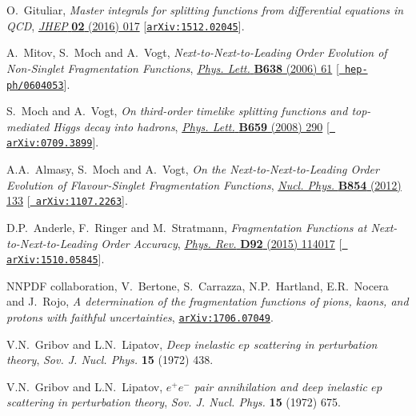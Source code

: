 \documentclass[12pt]{article}
\begin{document}
{\begin{thebibliography}{100}
O.~Gituliar, \emph{{Master integrals for splitting functions from differential
  equations in QCD}},
  \href{https://dx.doi.org/10.1007/JHEP02(2016)017}{\emph{JHEP} {\bf 02} (2016)
  017} [\href{https://arxiv.org/abs/1512.02045}{{\tt arXiv:1512.02045}}].

A.~Mitov, S.~Moch and A.~Vogt, \emph{{Next-to-Next-to-Leading Order Evolution
  of Non-Singlet Fragmentation Functions}},
  \href{https://dx.doi.org/10.1016/j.physletb.2006.05.005}{\emph{Phys. Lett.}
  {\bf B638} (2006) 61} [\href{https://arxiv.org/abs/hep-ph/0604053}{{\tt
  hep-ph/0604053}}].

S.~Moch and A.~Vogt, \emph{{On third-order timelike splitting functions and
  top-mediated Higgs decay into hadrons}},
  \href{https://dx.doi.org/10.1016/j.physletb.2007.10.069}{\emph{Phys. Lett.}
  {\bf B659} (2008) 290} [\href{https://arxiv.org/abs/0709.3899}{{\tt
  arXiv:0709.3899}}].

A.A.~Almasy, S.~Moch and A.~Vogt, \emph{{On the Next-to-Next-to-Leading Order
  Evolution of Flavour-Singlet Fragmentation Functions}},
  \href{https://dx.doi.org/10.1016/j.nuclphysb.2011.08.028}{\emph{Nucl. Phys.}
  {\bf B854} (2012) 133} [\href{https://arxiv.org/abs/1107.2263}{{\tt
  arXiv:1107.2263}}].

D.P.~Anderle, F.~Ringer and M.~Stratmann, \emph{{Fragmentation Functions at
  Next-to-Next-to-Leading Order Accuracy}},
  \href{https://dx.doi.org/10.1103/PhysRevD.92.114017}{\emph{Phys. Rev.} {\bf
  D92} (2015) 114017} [\href{https://arxiv.org/abs/1510.05845}{{\tt
  arXiv:1510.05845}}].

{\scshape NNPDF} collaboration, V.~Bertone, S.~Carrazza, N.P.~Hartland,
  E.R.~Nocera and J.~Rojo, \emph{{A determination of the fragmentation
  functions of pions, kaons, and protons with faithful uncertainties}},
  \href{https://arxiv.org/abs/1706.07049}{{\tt arXiv:1706.07049}}.

V.N.~Gribov and L.N.~Lipatov, \emph{{Deep inelastic $ep$ scattering in
  perturbation theory}}, {\emph{Sov. J. Nucl. Phys.} {\bf 15} (1972) 438}.

V.N.~Gribov and L.N.~Lipatov, \emph{{$e^+e^-$ pair annihilation and deep 
  inelastic $ep$ scattering in perturbation theory}}, 
  {\emph{Sov. J. Nucl. Phys.} {\bf 15}
  (1972) 675}.


\end{thebibliography}}
\end{document}
